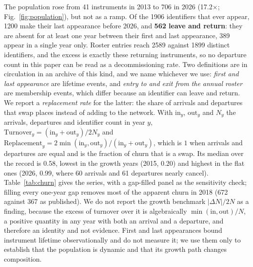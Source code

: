 \documentclass[fleqn,10pt,lineno]{wlpeerj}
\newcommand{\nFirst}{41}
\newcommand{\nLast}{706}
\newcommand{\growth}{17.2}
\newcommand{\replMedian}{0.58}
\begin{document}
The population rose from \nFirst{} instruments in 2013 to \nLast{} in 2026
(\growth$\times$; Fig.~\ref{fig:population}), but not as a ramp. Of the \num{1906}
identifiers that ever appear, \num{1200} make their last appearance before 2026, and
\textbf{562 leave and return}: they are absent for at least one year between their first and
last appearance, 389 appear in a single year only. Roster entries reach \num{2589} against
\num{1899} distinct identifiers, and the excess is exactly these returning instruments, so no
departure count in this paper can be read as a decommissioning rate. Two definitions are in
circulation in an archive of this kind, and we name whichever we use: \emph{first and last
appearance} are lifetime events, and \emph{entry to and exit from the annual roster} are
membership events, which differ because an identifier can leave and return. We report a
\emph{replacement rate} for the latter: the share of arrivals and departures that swap places
instead of adding to the network. With $\mathrm{in}_y$, $\mathrm{out}_y$ and $N_y$ the arrivals,
departures and identifier count in year $y$, $\mathrm{Turnover}_y =
(\mathrm{in}_y+\mathrm{out}_y)/2N_y$ and $\mathrm{Replacement}_y =
2\min(\mathrm{in}_y,\mathrm{out}_y)/(\mathrm{in}_y+\mathrm{out}_y)$, which is $1$ when arrivals
and departures are equal and is the fraction of churn that is a swap. Its median over the record
is \replMedian{}, lowest in the growth years (2015, 0.20) and highest in the flat ones (2026,
0.99, where 60 arrivals and 61 departures nearly cancel). Table~\ref{tab:churn} gives the series,
with a gap-filled panel as the sensitivity check; filling every one-year gap removes most of the
apparent churn in 2018 (672 against 367 as published). We do not report the growth benchmark
$|\Delta N|/2N$ as a finding, because the excess of turnover over it is algebraically
$\min(\mathrm{in},\mathrm{out})/N$, a positive quantity in any year with both an arrival and a
departure, and therefore an identity and not evidence. First and last appearances bound instrument
lifetime observationally and do not measure it; we use them only to establish that the
population is dynamic and that its growth path changes composition.
\end{document}
